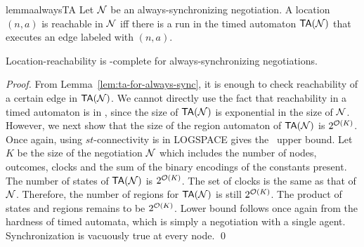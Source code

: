 \begin{restatable}{lemma}{alwaysTA}
\label{lem:ta-for-always-sync}
  Let $\mathcal{N}$ be an always-synchronizing negotiation. A location $(n,a)$
  is reachable in $\mathcal{N}$ iff there is a run in the timed automaton
  $\mathsf{TA}(\mathcal{N})$ that executes an edge labeled with $(n,a)$.
\end{restatable}

\begin{theorem}
  Location-reachability is \PSPACE-complete for always-synchronizing
  negotiations.
\end{theorem}
\begin{proof}
  From Lemma~\ref{lem:ta-for-always-sync}, it is enough to check
  reachability of a certain edge in $\mathsf{TA}(\mathcal{N})$. We cannot directly use
  the fact that reachability in a timed automaton is in \PSPACE, since
  the size of $\mathsf{TA}(\mathcal{N})$ is exponential in the size of $\mathcal{N}$. However,
  we next show that the size of the region automaton of $\mathsf{TA}(\mathcal{N})$ is 
  $2^{\mathcal{O}(K)}$. Once again, using $st$-connectivity is in
  \textsf{LOGSPACE} gives the \PSPACE\ upper bound. 
  Let $K$ be the size of the negotiation $\mathcal{N}$ which
  includes the number of nodes, outcomes, clocks and the sum of the
  binary encodings of the constants present. 
  The number of states of $\mathsf{TA}(\mathcal{N})$ is $2^{\mathcal{O}(K)}$. The set of
  clocks is the same as that of $\mathcal{N}$. Therefore, the number of
  regions for $\mathsf{TA}(\mathcal{N})$ is still $2^{\mathcal{O}(K)}$. The product of states
  and regions remains to be $2^{\mathcal{O}(K)}$. 
  Lower bound follows once again from the hardness of timed
  automata, which is simply a negotiation with a single
  agent. Synchronization is vacuously true at every node. \qed
\end{proof}
